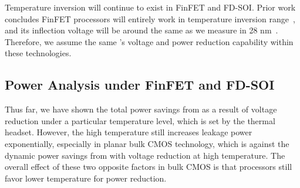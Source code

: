 Temperature inversion will continue to exist in FinFET and FD-SOI. Prior work concludes FinFET processors will entirely work in temperature inversion range~\cite{lee2014dynamic,cai2015tei}, and its inflection voltage will be around the same as we measure in 28 nm~\cite{lee2014dynamic}. Therefore, we assume the same \tistate's voltage and power reduction capability within these technologies. 

\subsection{\tistate Power Analysis under FinFET and FD-SOI}

Thus far, we have shown the total power savings from \tistate as a result of voltage reduction under a particular temperature level, which is set by the thermal headset. However, the high temperature still increases leakage power exponentially, especially in planar bulk CMOS technology, which is against the dynamic power savings from \tistate with voltage reduction at high temperature. The overall effect of these two opposite factors in bulk CMOS is that processors still favor lower temperature for power reduction. 

